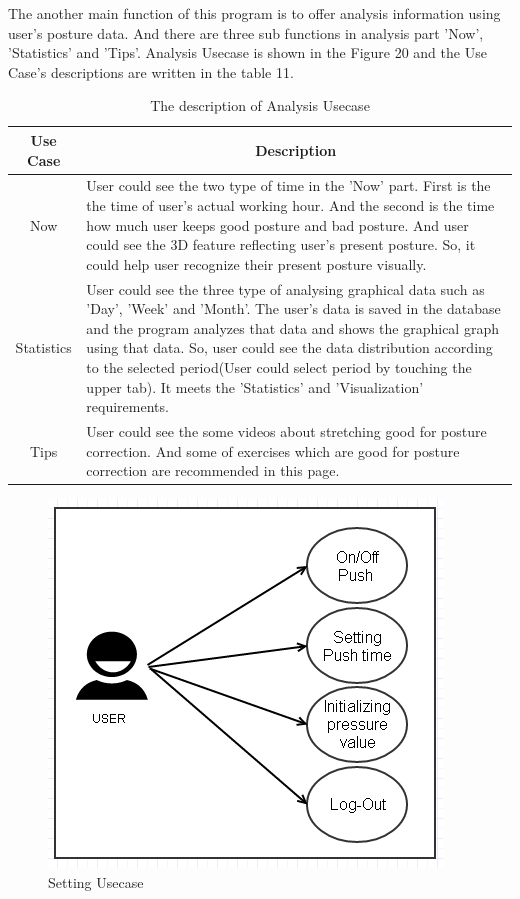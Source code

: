 \documentclass[conference]{IEEEtran}
\begin{document}
 The another main function of this program is to offer analysis information using user's posture data. And there are three sub functions in analysis part 'Now', 'Statistics' and 'Tips'. Analysis Usecase is shown in the Figure 20 and the Use Case's descriptions are written in the table 11. 

\begin{table}[h]
{\renewcommand\arraystretch{1.25}
\caption{The description of Analysis Usecase}
\begin{tabular}{|c|l|l|} \hline
Use Case & \multicolumn{2}{c|}{Description} \\ \hline\hline
Now & \multicolumn{2}{p{6cm}|}{\raggedright User could see the two type of time in the 'Now' part. First is the the time of user's actual working hour. And the second is the time how much user keeps good posture and bad posture. And user could see the 3D feature reflecting user's present posture. So, it could help user recognize their present posture visually.} \\ \hline
Statistics & \multicolumn{2}{p{6cm}|}{\raggedright User could see the three type of analysing graphical data such as 'Day', 'Week' and 'Month'. The user's data is saved in the database and the program analyzes that data and shows the graphical graph using that data. So, user could see the data distribution according to the selected period(User could select period by touching the upper tab).  It meets the 'Statistics' and 'Visualization' requirements.} \\ \hline
Tips & \multicolumn{2}{p{6cm}|}{\raggedright User could see the some videos about stretching good for posture correction. And some of exercises which are good for posture correction  are recommended in this page.} \\ \hline
\end{tabular}}
\end{table}

\begin{figure}[H]
\begin{center}
    \includegraphics[scale=0.8]{img_22.png}
    \caption{Setting Usecase} 
\end{center}
\end{figure}
  	        	  
\end{document}
